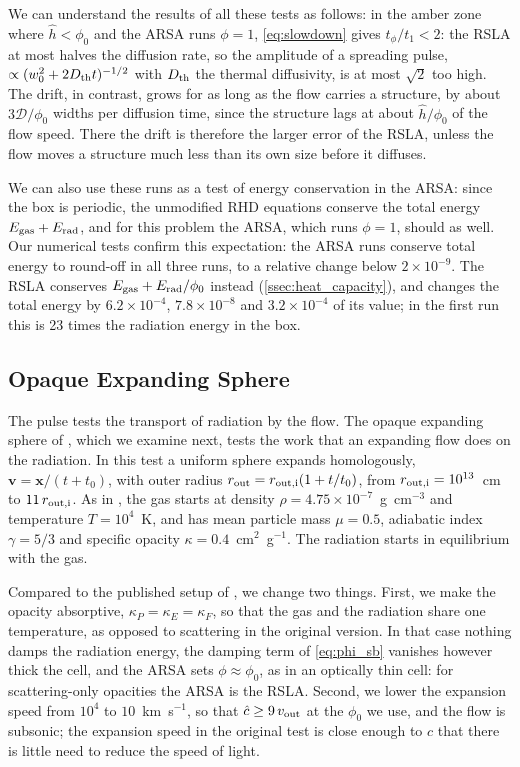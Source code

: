\documentclass[preprint,12pt,authoryear]{elsarticle}
\newcommand{\vecx}{\mathbf{x}}
\newcommand{\vecv}{\mathbf{v}}
\newcommand{\calD}{\mathcal{D}}
\begin{document}
We can understand the results of all these tests as follows: in the amber zone where $\hat{h} < \phi_0$ and the ARSA runs $\phi = 1$, \autoref{eq:slowdown} gives $t_\phi/t_1 < 2$: the RSLA at most halves the diffusion rate, so the amplitude of a spreading pulse, $\propto (w_0^2 + 2D_{\rm th} t)^{-1/2}$ with $D_{\rm th}$ the thermal diffusivity, is at most $\sqrt{2}$ too high.
The drift, in contrast, grows for as long as the flow carries a structure, by about $3\calD/\phi_0$ widths per diffusion time, since the structure lags at about $\hat{h}/\phi_0$ of the flow speed. There the drift is therefore the larger error of the RSLA, unless the flow moves a structure much less than its own size before it diffuses.

We can also use these runs as a test of energy conservation in the ARSA: since the box is periodic, the unmodified RHD equations conserve the total energy $E_{\rm gas} + E_{\rm rad}$, and for this problem the ARSA, which runs $\phi = 1$, should as well. Our numerical tests confirm this expectation: the ARSA runs conserve total energy to round-off in all three runs, to a relative change below $2\times10^{-9}$. The RSLA conserves $E_{\rm gas} + E_{\rm rad}/\phi_0$ instead (\autoref{ssec:heat_capacity}), and changes the total energy by $6.2\times10^{-4}$, $7.8\times10^{-8}$ and $3.2\times10^{-4}$ of its value; in the first run this is 23 times the radiation energy in the box.

\subsection{Opaque Expanding Sphere}
\label{ssec:test_sphere}

The pulse tests the transport of radiation by the flow. The opaque expanding sphere of \citet{Roth15a}, which we examine next, tests the work that an expanding flow does on the radiation. In this test a uniform sphere expands homologously, $\vecv = \vecx/(t + t_0)$, with outer radius $r_{\rm out} = r_{\rm out,i}(1 + t/t_0)$, from $r_{\rm out,i} = 10^{13}$~cm to $11\,r_{\rm out,i}$. As in \citet{Roth15a}, the gas starts at density $\rho = 4.75\times10^{-7}$~g~cm$^{-3}$ and temperature $T = 10^4$~K, and has mean particle mass $\mu = 0.5$, adiabatic index $\gamma = 5/3$ and specific opacity $\kappa = 0.4$~cm$^2$~g$^{-1}$. The radiation starts in equilibrium with the gas.


Compared to the published setup of \citet{Roth15a}, we change two things. First, we make the opacity absorptive, $\kappa_P = \kappa_E = \kappa_F$, so that the gas and the radiation share one temperature, as opposed to scattering in the original version. In that case nothing damps the radiation energy, the damping term of \autoref{eq:phi_sb} vanishes however thick the cell, and the ARSA sets $\phi \approx \phi_0$, as in an optically thin cell: for scattering-only opacities the ARSA is the RSLA. Second, we lower the expansion speed from $10^4$ to $10$~km~s$^{-1}$, so that $\hat{c} \geq 9\,v_{\rm out}$ at the $\phi_0$ we use, and the flow is subsonic; the expansion speed in the original test is close enough to $c$ that there is little need to reduce the speed of light.
\end{document}
